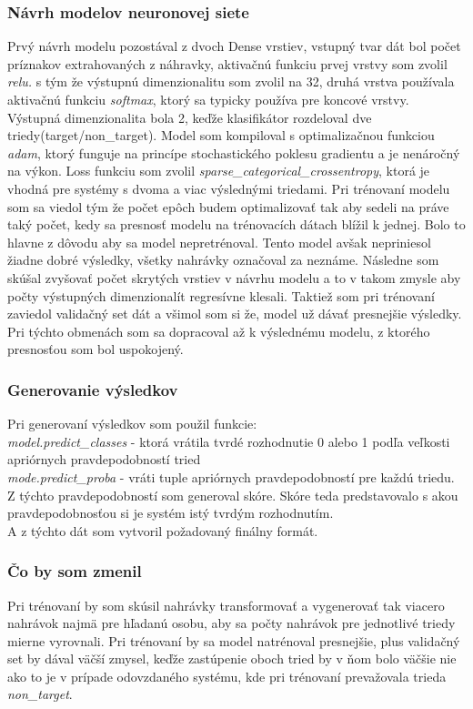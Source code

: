\documentclass{article}
\begin{document}
    \subsubsection{Návrh modelov neuronovej siete}
    \Large{Prvý návrh modelu pozostával z dvoch Dense vrstiev, vstupný tvar dát bol počet príznakov extrahovaných z náhravky, aktivačnú funkciu prvej vrstvy som zvolil \textit{relu.} s tým že výstupnú dimenzionalitu som zvolil na 32, druhá vrstva používala aktivačnú funkciu \textit{softmax}, ktorý sa typicky používa pre koncové vrstvy. Výstupná dimenzionalita bola 2, keďže klasifikátor rozdeloval dve triedy(target/non\_target). Model som kompiloval s optimalizačnou funkciou \textit{adam}, ktorý funguje na princípe stochastického poklesu gradientu a je nenáročný na výkon. Loss funkciu som zvolil \textit{sparse\_categorical\_crossentropy}, ktorá je vhodná pre systémy s dvoma a viac výslednými triedami. Pri trénovaní modelu som sa viedol tým že počet epôch budem optimalizovať tak aby sedeli na práve taký počet, kedy sa presnosť modelu na trénovacích dátach blížil k jednej. Bolo to hlavne z dôvodu aby sa model nepretrénoval. Tento model avšak nepriniesol žiadne dobré výsledky, všetky nahrávky označoval za neznáme. Následne som skúšal zvyšovať počet skrytých vrstiev v návrhu modelu a to v takom zmysle aby počty výstupných dimenzionalít regresívne klesali. Taktiež som pri trénovaní zaviedol validačný set dát a všimol som si že, model už dávať presnejšie výsledky.  Pri týchto obmenách som sa dopracoval až k výslednému modelu, z ktorého presnosťou som bol uspokojený. }
    \subsubsection{Generovanie výsledkov}
    \Large{Pri generovaní výsledkov som použil funkcie:\\
    \textit{model.predict\_classes} - ktorá vrátila tvrdé rozhodnutie 0 alebo 1 podľa veľkosti apriórnych pravdepodobností tried\\
    \textit{mode.predict\_proba} - vráti tuple apriórnych pravdepodobností pre každú triedu. Z týchto pravdepodobností som generoval skóre. Skóre teda predstavovalo s akou pravdepodobnosťou si je systém istý tvrdým rozhodnutím. \\
    A z týchto dát som vytvoril požadovaný finálny formát. }
    \subsubsection{Čo by som zmenil}
    \Large{Pri trénovaní by som skúsil nahrávky transformovať a vygenerovať tak viacero nahrávok najmä pre hľadanú osobu, aby sa počty nahrávok pre jednotlivé triedy mierne vyrovnali. Pri trénovaní by sa model natrénoval presnejšie, plus validačný set by dával väčší zmysel, keďže zastúpenie oboch tried by v ňom bolo väčšie nie ako to je v prípade odovzdaného systému, kde pri trénovaní prevažovala trieda \textit{non\_target}. }
\end{document}
